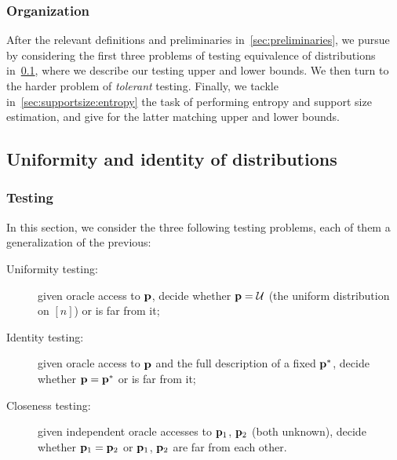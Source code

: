   \subsubsection{Organization}
  After the relevant definitions and preliminaries in~\cref{sec:preliminaries}, we pursue by considering the first three problems of testing equivalence of distributions in~\cref{sec:uniformity:equivalence:identity}, where we describe our testing upper and lower bounds. We then turn to the harder problem of \emph{tolerant} testing. Finally, we tackle in~\cref{sec:supportsize:entropy} the task of performing entropy and support size estimation, and give for the latter matching upper and lower bounds.

 \subsection{Uniformity and identity of distributions}\label{sec:uniformity:equivalence:identity}
\subsubsection{Testing}\label{sec:uniformity:equivalence:identity:testing}
In this section, we consider the three following testing problems, each of them a generalization of the previous:
\begin{description}
  \item[Uniformity testing:] given oracle access to $\mathbf{p}$, decide whether $\mathbf{p}=\mathcal{U}$ (the uniform distribution on $[n]$) or is far from it;
  \item[Identity testing:] given oracle access to $\mathbf{p}$ and the full description of a fixed $\mathbf{p}^\ast$, decide whether $\mathbf{p}=\mathbf{p}^\ast$ or is far from it; 
  \item[Closeness testing:] given independent oracle accesses to $\mathbf{p}_1$, $\mathbf{p}_2$ (both unknown), decide whether $\mathbf{p}_1=\mathbf{p}_2$ or $\mathbf{p}_1$, $\mathbf{p}_2$ are far from each other. 
\end{description}

